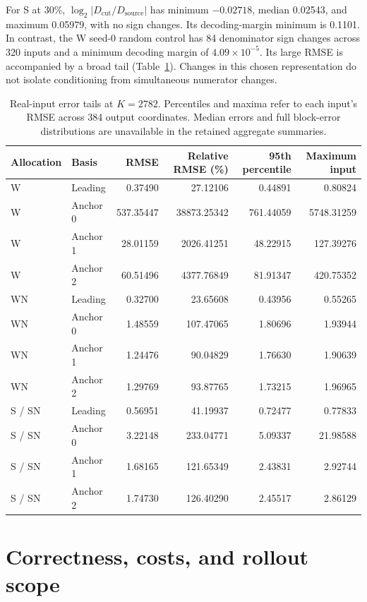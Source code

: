 \documentclass{article}
\begin{document}
For S at 30\%, $\log_2|D_{\mathrm{cut}}/D_{\mathrm{source}}|$ has minimum $-0.02718$, median 0.02543, and maximum 0.05979, with no sign changes. Its decoding-margin minimum is 0.1101. In contrast, the W seed-0 random control has 84 denominator sign changes across 320 inputs and a minimum decoding margin of $4.09\times10^{-5}$. Its large RMSE is accompanied by a broad tail (Table~\ref{tab.blocktails}). Changes in this chosen representation do not isolate conditioning from simultaneous numerator changes.

\begin{table}[ht]
\centering\small\setlength{\tabcolsep}{7pt}
\begin{tabular}{@{}llrrrr@{}}
\toprule
Allocation & Basis & RMSE & Relative RMSE (\%) & 95th percentile & Maximum input\\
\midrule
W & Leading & 0.37490 & 27.12106 & 0.44891 & 0.80824\\
W & Anchor 0 & 537.35447 & 38873.25342 & 761.44059 & 5748.31259\\
W & Anchor 1 & 28.01159 & 2026.41251 & 48.22915 & 127.39276\\
W & Anchor 2 & 60.51496 & 4377.76849 & 81.91347 & 420.75352\\
WN & Leading & 0.32700 & 23.65608 & 0.43956 & 0.55265\\
WN & Anchor 0 & 1.48559 & 107.47065 & 1.80696 & 1.93944\\
WN & Anchor 1 & 1.24476 & 90.04829 & 1.76630 & 1.90639\\
WN & Anchor 2 & 1.29769 & 93.87765 & 1.73215 & 1.96965\\
S / SN & Leading & 0.56951 & 41.19937 & 0.72477 & 0.77833\\
S / SN & Anchor 0 & 3.22148 & 233.04771 & 5.09337 & 21.98588\\
S / SN & Anchor 1 & 1.68165 & 121.65349 & 2.43831 & 2.92744\\
S / SN & Anchor 2 & 1.74730 & 126.40290 & 2.45517 & 2.86129\\
\bottomrule
\end{tabular}
\caption{Real-input error tails at $K=2782$. Percentiles and maxima refer to each input's RMSE across 384 output coordinates. Median errors and full block-error distributions are unavailable in the retained aggregate summaries.}
\label{tab.blocktails}
\end{table}

\clearpage
\section{Correctness, costs, and rollout scope}
\label{app.evidence}
\end{document}
